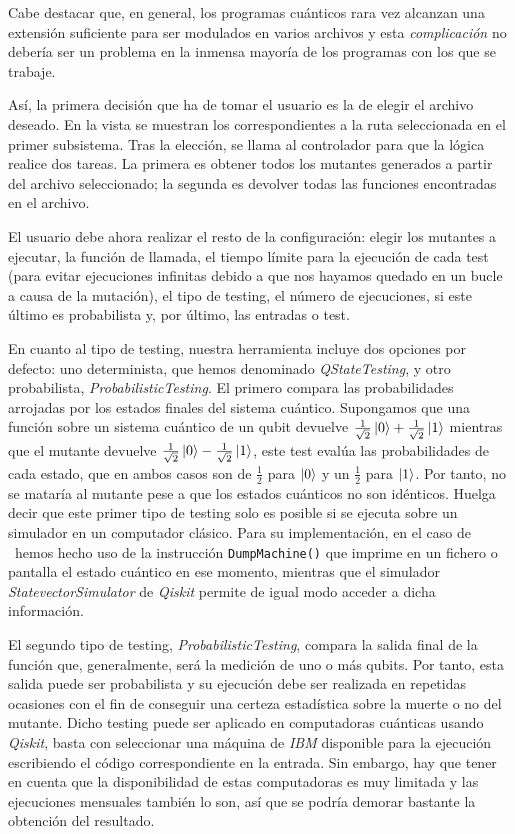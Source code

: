 Cabe destacar que, en general, los programas cuánticos rara vez alcanzan una extensión suficiente para ser modulados en varios archivos y esta {\it complicación} no debería ser un problema en la inmensa mayoría de los programas con los que se trabaje.

Así, la primera decisión que ha de tomar el usuario es la de elegir el archivo deseado. En la vista se muestran los correspondientes a la ruta seleccionada en el primer subsistema. Tras la elección, se llama al controlador para que la lógica realice dos tareas. La primera es obtener todos los mutantes generados a partir del archivo seleccionado; la segunda es devolver todas las funciones encontradas en el archivo.

El usuario debe ahora realizar el resto de la configuración: elegir los mutantes a ejecutar, la función de llamada, el tiempo límite para la ejecución de cada test (para evitar ejecuciones infinitas debido a que nos hayamos quedado en un bucle a causa de la mutación), el tipo de testing, el número de ejecuciones, si este último es probabilista y, por último, las entradas o test.

En cuanto al tipo de testing, nuestra herramienta incluye dos opciones por defecto: uno determinista, que hemos denominado {\textit{QStateTesting}}, y otro probabilista, {\textit{ProbabilisticTesting}}. El primero compara las probabilidades arrojadas por los estados finales del sistema cuántico. Supongamos que una función sobre un sistema cuántico de un qubit devuelve $\frac{1}{\sqrt{2}}\left|0\right\rangle+\frac{1}{\sqrt{2}}\left|1\right\rangle$ mientras que el mutante devuelve $\frac{1}{\sqrt{2}}\left|0\right\rangle-\frac{1}{\sqrt{2}}\left|1\right\rangle$, este test evalúa las probabilidades de cada estado, que en ambos casos son de $\frac{1}{2}$ para $\left|0\right\rangle$ y un $\frac{1}{2}$ para $\left|1\right\rangle$. Por tanto, no se mataría al mutante pese a que los estados cuánticos no son idénticos.
%
Huelga decir que este primer tipo de testing solo es posible si se ejecuta sobre un simulador en un computador clásico. Para su implementación, en el caso de \qsh\ hemos hecho uso de la instrucción \texttt{DumpMachine()} que imprime en un fichero o pantalla el estado cuántico en ese momento, mientras que el simulador \textit{StatevectorSimulator} de \textit{Qiskit} permite de igual modo acceder a dicha información.

El segundo tipo de testing, \textit{ProbabilisticTesting}, compara la salida final de la función que, generalmente, será la medición de uno o más qubits. Por tanto, esta salida puede ser probabilista y su ejecución debe ser realizada en repetidas ocasiones con el fin de conseguir una certeza estadística sobre la muerte o no del mutante. Dicho testing puede ser aplicado en computadoras cuánticas usando \textit{Qiskit}, basta con seleccionar una máquina de \textit{IBM} disponible para la ejecución escribiendo el código correspondiente en la entrada. Sin embargo, hay que tener en cuenta que la disponibilidad de estas computadoras es muy limitada y las ejecuciones mensuales también lo son, así que se podría demorar bastante la obtención del resultado.

